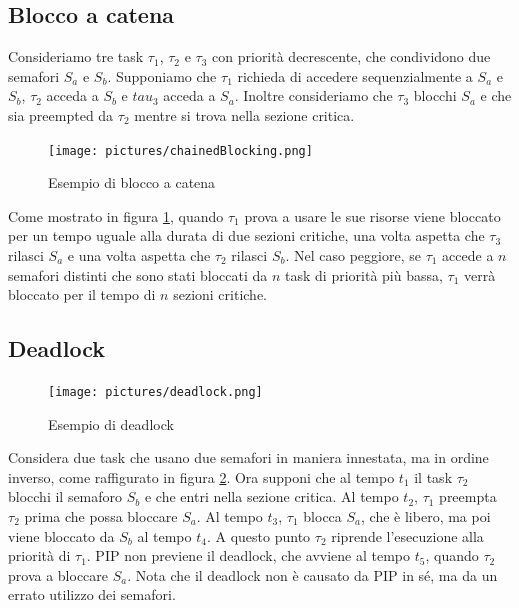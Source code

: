 \documentclass[12pt,openany,onesided]{book}
\begin{document}
\subsection{Blocco a catena}
Consideriamo tre task $\tau_1$, $\tau_2$ e $\tau_3$ con priorità decrescente, che condividono due semafori $S_a$ e $S_b$.
Supponiamo che $\tau_1$ richieda di accedere sequenzialmente a $S_a$ e $S_b$, $\tau_2$ acceda a $S_b$ e $tau_3$ acceda a $S_a$.
Inoltre consideriamo che $\tau_3$ blocchi $S_a$ e che sia preempted da $\tau_2$ mentre si trova nella sezione critica.
\begin{figure}[H]
    \centering
    \texttt{[image: pictures/chainedBlocking.png]}
    \caption{Esempio di blocco a catena}
    \label{fig:bloccoACatena}
\end{figure}
\noindent
Come mostrato in figura \ref{fig:bloccoACatena}, quando $\tau_1$ prova a usare le sue risorse viene bloccato per un tempo uguale alla durata di due sezioni critiche, una volta aspetta che
$\tau_3$ rilasci $S_a$ e una volta aspetta che $\tau_2$ rilasci $S_b$.
Nel caso peggiore, se $\tau_1$ accede a $n$ semafori distinti che sono stati bloccati da $n$ task di priorità più bassa, $\tau_1$ verrà bloccato per il tempo di $n$ sezioni critiche.
\subsection{Deadlock}
\begin{figure}[H]
    \centering
    \texttt{[image: pictures/deadlock.png]}
    \caption{Esempio di deadlock}
    \label{fig:deadlock}
\end{figure}
Considera due task che usano due semafori in maniera innestata, ma in ordine inverso, come raffigurato in figura \ref{fig:deadlock}.
Ora supponi che al tempo $t_1$ il task $\tau_2$ blocchi il semaforo $S_b$ e che entri nella sezione critica.
Al tempo $t_2$, $\tau_1$ preempta $\tau_2$ prima che possa bloccare $S_a$.
Al tempo $t_3$, $\tau_1$ blocca $S_a$, che è libero, ma poi viene bloccato da $S_b$ al tempo $t_4$.
A questo punto $\tau_2$ riprende l'esecuzione alla priorità di $\tau_1$. PIP non previene il deadlock, che avviene al tempo $t_5$, quando $\tau_2$ prova a bloccare $S_a$.
Nota che il deadlock non è causato da PIP in sé, ma da un errato utilizzo dei semafori. 
\end{document}
